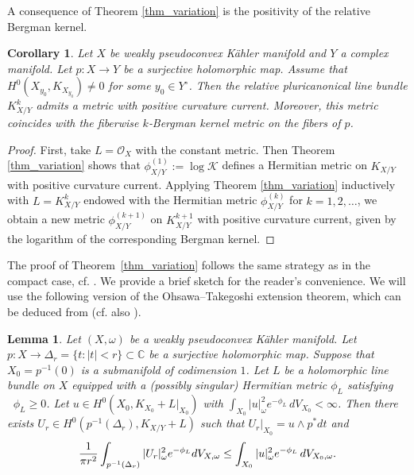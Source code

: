 \documentclass[a4paper, 11pt]{amsart}
\theoremstyle{plain}
\numberwithin{equation}{section} %
\numberwithin{figure}{section} %
\theoremstyle{plain}
\theoremstyle{plain}
\newtheorem{corollary}[theorem]{Corollary} %
\theoremstyle{plain}
\theoremstyle{plain}
\newtheorem{lemma}[theorem]{Lemma} %
\theoremstyle{remark}
\theoremstyle{definition}
\theoremstyle{definition}
\newcommand{\K}{\mathcal{K}}
\DeclareMathOperator \ddc{\textrm{dd}^c}
\begin{document}
{A consequence of Theorem \ref{thm_variation} is the positivity of the relative Bergman kernel.
\begin{corollary} Let $X$ be weakly pseudoconvex K\"ahler manifold and $Y$ a complex manifold. 
Let $p: X\to Y$ be a surjective holomorphic map.
 Assume that $H^0(X_{y_0}, K_{X_{y_0}})\neq 0$ for some $y_0\in Y^\circ$. Then the relative pluricanonical line bundle $K^k_{X/Y}$ admits a metric with positive curvature current. Moreover, this metric coincides with the fiberwise $k$‑Bergman kernel metric on the fibers of $p$.
\end{corollary}
\begin{proof}
   First, take $L=\mathcal{O}_X$ with the constant metric. Then Theorem \ref{thm_variation} shows that $\phi^{(1)}_{X/Y}:=\log \K$ defines a Hermitian metric on $K_{X/Y}$ with positive curvature current. Applying Theorem \ref{thm_variation} inductively with $L=K^k_{X/Y}$ endowed with the Hermitian metric $\phi_{X/Y}^{(k)}$ for $k=1,2,\ldots$, we obtain a new metric $\phi_{X/Y}^{(k+1)}$ on $K_{X/Y}^{k+1}$ with positive curvature current, given by the logarithm of the corresponding Bergman kernel. 
\end{proof}


The proof of Theorem~\ref{thm_variation} follows the same strategy as in the compact case, cf. \cite{Berndtsson_Paun_08, Paun_Takayama_2018,Zhou_Zhu_L_2_jdg}. 
We provide a brief sketch for the reader’s convenience.
We will use the following version of the Ohsawa--Takegoshi extension theorem, which can be deduced from \cite[Theorem~1.1]{Zhou_Zhu_L_2_jdg} (cf. also \cite{cao17-OTtheorem, BL16-OTproof, GuanZhou-l2extension-pb,Xu-Zhou24-optimal-L2}).
\begin{lemma}\label{lem: OT-theorem} Let $(X,\omega)$ be a weakly pseudoconvex K\"ahler manifold. 
    Let $p:X\rightarrow \Delta_r=\{t: |t|<r\} \subset \mathbb{C}$ be a surjective holomorphic map. Suppose that $X_0=p^{-1}(0)$ is a submanifold of codimension $1$. Let $L$ be a holomorphic line bundle on $X$ equipped with a (possibly singular) Hermitian metric $\phi_L$ satisfying $\ddc\phi_L \ge 0$.
   Let $u \in H^0(X_0, K_{X_0} + L|_{X_0})$ with $\int_{X_0} |u|^2_\omega e^{-\phi_L}\, dV_{X_0} < \infty$. Then there exists $U_r \in H^0(p^{-1}(\Delta_r), K_{X/Y}+L)$ such that $U_r|_{X_0} = u \wedge p^*dt$ and
    $$\frac{1}{\pi r^2}\int_{p^{-1}({\Delta_r)}} |U_r|^2_\omega e^{-\phi_L}{\rm d}V_{X,\omega}\leq \int_{X_0} |u|^2_\omega e^{-\phi_L}\,{\rm d}V_{X_0,\omega}.$$
\end{lemma}







}
\end{document}
